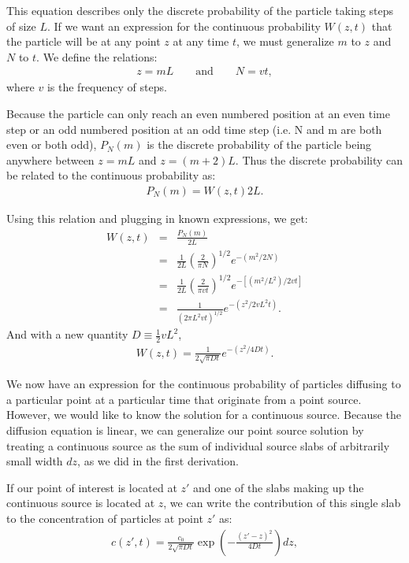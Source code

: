\documentclass[draft, jgrga]{AGUTeX}
\begin{document}
\begin{article}
This equation describes only the discrete probability of the particle taking steps of size $L$. If we want an expression for the continuous probability $W(z,t)$ that the particle will be at any point $z$ at any time $t$, we must generalize $m$ to $z$ and $N$ to $t$. We define the relations:
\begin{eqnarray}
z = mL \qquad \mbox{and} \qquad N = vt,
\end{eqnarray}
where $v$ is the frequency of steps.

Because the particle can only reach an even numbered position at an even time step or an odd numbered position at an odd time step (i.e. N and m are both even or both odd), $P_N(m)$ is the discrete probability of the particle being anywhere between $z = mL$ and $z = (m+2)L$. Thus the discrete probability can be related to the continuous probability as:
\begin{eqnarray}
  \label{eq:probrelate}
P_N(m) = W(z,t)2L.
\end{eqnarray}

Using this relation and plugging in known expressions, we get:
\begin{eqnarray}
W(z,t) & = & \frac{P_N(m)}{2L} \nonumber \\
& = & \frac{1}{2L} \left(\frac{2}{\pi N}\right)^{1/2} e^{-(m^2/2N)} \nonumber \\
& = & \frac{1}{2L} \left(\frac{2}{\pi vt}\right)^{1/2} e^{-[(m^2/L^2)/2vt]} \nonumber \\
& = & \frac{1}{(2 \pi L^2 vt)^{1/2}}e^{-(z^2/2vL^2t)}.
\end{eqnarray}
And with a new quantity \begin{math} D \equiv \frac{1}{2} v L^2 \end{math},
\begin{eqnarray}
W(z,t) = \frac{1}{2\sqrt{\pi Dt}}e^{-(z^2/4Dt)}.
\end{eqnarray}

We now have an expression for the continuous probability of particles diffusing to a particular point at a particular time that originate from a point source. However, we would like to know the solution for a continuous source. Because the diffusion equation is linear, we can generalize our point source solution by treating a continuous source as the sum of individual source slabs of arbitrarily small width $dz$, as we did in the first derivation.

If our point of interest is located at $z'$ and one of the slabs making up the continuous source is located at $z$, we can write the contribution of this single slab to the concentration of particles at point $z'$ as:
\begin{eqnarray}
c(z',t) = \frac{c_0}{2\sqrt{\pi Dt}} \exp \left(-\frac{(z' -z)^2}{4Dt}\right) dz,
\end{eqnarray}


\end{article}
\end{document}
